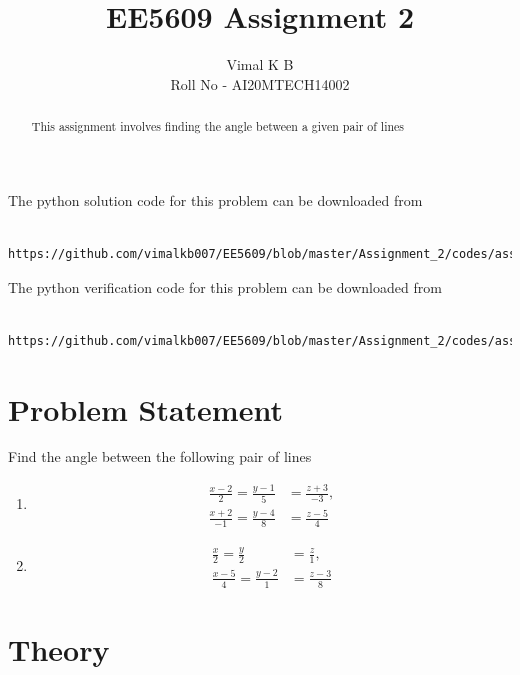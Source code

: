 \documentclass[journal,12pt,twocolumn]{IEEEtran}
\begin{document}
\title{EE5609 Assignment 2}
\author{Vimal K B \\Roll No - AI20MTECH14002}

\maketitle
\newpage
\bigskip

\renewcommand{\thefigure}{\theenumi}
\renewcommand{\thetable}{\theenumi}

\begin{abstract}
	This assignment involves finding the angle between a given pair of lines 
\end{abstract}

The python solution code for this problem can be downloaded from

\begin{lstlisting}
	https://github.com/vimalkb007/EE5609/blob/master/Assignment_2/codes/assignment2_solution.py
\end{lstlisting}

The python verification code for this problem can be downloaded from

\begin{lstlisting}
	https://github.com/vimalkb007/EE5609/blob/master/Assignment_2/codes/assignment2_solution_verify.py
\end{lstlisting}

\section{\textbf{Problem Statement}}
	Find the angle between the following pair of lines
	\begin{enumerate}
		\item 
		\begin{align}\label{eq1}
			\frac{x-2}{2} = \frac{y-1}{5} &= \frac{z+3}{-3}, 
			\\
			\frac{x+2}{-1} = \frac{y-4}{8} &= \frac{z-5}{4} 
		\end{align}
		\item 
		\begin{align}\label{eq2}
			\frac{x}{2} = \frac{y}{2} &= \frac{z}{1}, 
			\\
			\frac{x-5}{4} = \frac{y-2}{1} &= \frac{z-3}{8} 
		\end{align}
	\end{enumerate}
	
\section{\textbf{Theory}}
\end{document}
